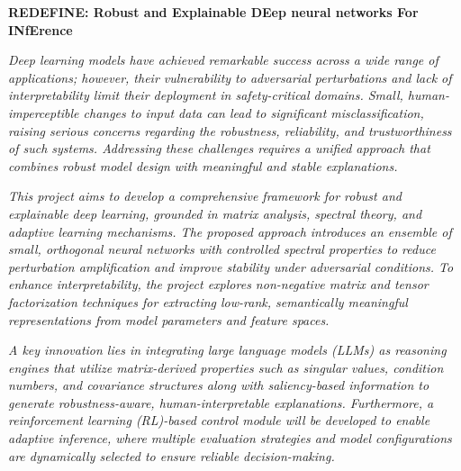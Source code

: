 \documentclass[a4paper,11pt]{article}
\begin{document}
	
\vspace*{0.5cm} %

\begin{center}
	{\LARGE \textbf{REDEFINE: Robust and Explainable DEep neural networks For INfErence}}
\end{center}

\vfill
	\emph{Deep learning models have achieved remarkable success across a wide range of applications; however, their vulnerability to adversarial perturbations and lack of interpretability limit their deployment in safety-critical domains. Small, human-imperceptible changes to input data can lead to significant misclassification, raising serious concerns regarding the robustness, reliability, and trustworthiness of such systems. Addressing these challenges requires a unified approach that combines robust model design with meaningful and stable explanations.}
	
	\emph{This project aims to develop a comprehensive framework for robust and explainable deep learning, grounded in matrix analysis, spectral theory, and adaptive learning mechanisms. The proposed approach introduces an ensemble of small, orthogonal neural networks with controlled spectral properties to reduce perturbation amplification and improve stability under adversarial conditions. To enhance interpretability, the project explores non-negative matrix and tensor factorization techniques for extracting low-rank, semantically meaningful representations from model parameters and feature spaces.}
	
	\emph{A key innovation lies in integrating large language models (LLMs) as reasoning engines that utilize matrix-derived properties such as singular values, condition numbers, and covariance structures along with saliency-based information to generate robustness-aware, human-interpretable explanations. Furthermore, a reinforcement learning (RL)-based control module will be developed to enable adaptive inference, where multiple evaluation strategies and model configurations are dynamically selected to ensure reliable decision-making.}
\end{document}
